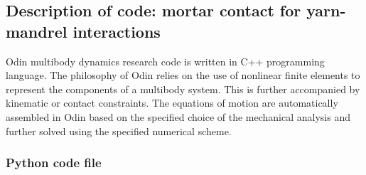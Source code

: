 \subsection{Description of code: mortar contact for yarn-mandrel interactions}
Odin multibody dynamics research code \cite{odin2022} is written in C++ programming language. The philosophy of Odin relies on the use of nonlinear finite elements to represent the components of a multibody system. This is further accompanied by kinematic or contact constraints. The equations of motion are automatically assembled in Odin based on the specified choice of the mechanical analysis and further solved using the specified numerical scheme.\\

\subsubsection{Python code file} 
